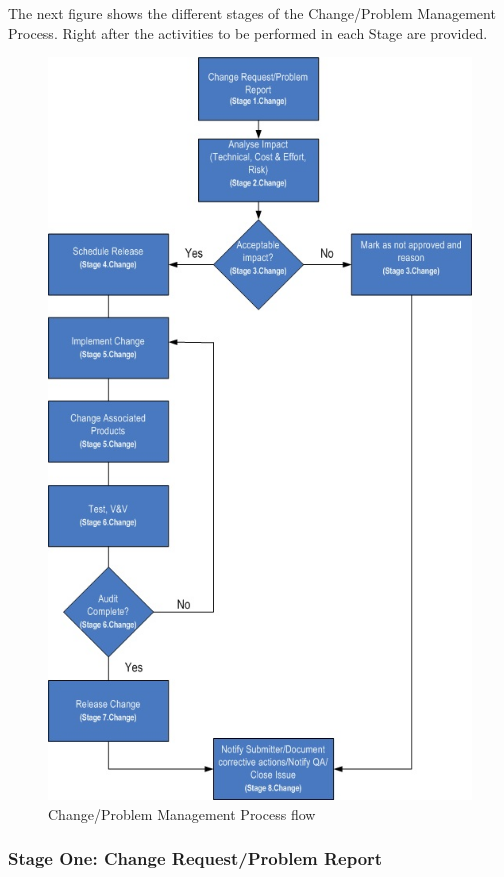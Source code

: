 \documentclass{template/openetcs_article}
\begin{document}
The next figure shows the different stages of the Change/Problem Management Process. Right after the activities to be performed in each Stage are provided. 

\begin{figure}[H]
\centering
\includegraphics{./figures/ChangeProblemManagementProcess.JPG}
\caption{Change/Problem Management Process flow}
\end{figure}


\subsubsection{Stage One: Change Request/Problem Report}
\end{document}
